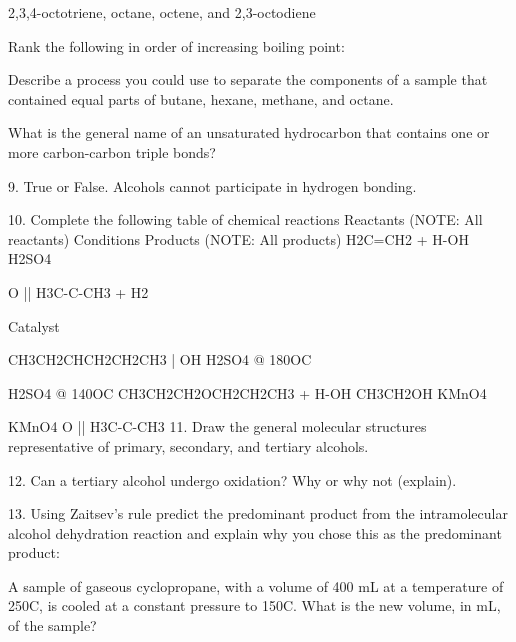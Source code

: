 \documentclass[addpoints, 12pt]{exam}
\begin{document}
\begin{questions}
2,3,4-octotriene, octane, octene, and 2,3-octodiene


\question Rank the following in order of increasing boiling point:

\question Describe a process you could use to separate the components
of a sample that contained equal parts of butane, hexane, methane, and
octane.

\question 




\question What is the general name of an unsaturated hydrocarbon that
contains one or more carbon-carbon triple bonds?



9. True or False.  Alcohols cannot participate in hydrogen bonding.


10. Complete the following table of chemical reactions
Reactants (NOTE: All reactants)
Conditions
Products (NOTE: All products) 
H2C=CH2 + H-OH 
H2SO4

        O
          ||
H3C-C-CH3 + H2

Catalyst

CH3CH2CHCH2CH2CH3
             |
             OH
H2SO4 @ 180OC


H2SO4 @ 140OC
CH3CH2CH2OCH2CH2CH3 + H-OH
CH3CH2OH
KMnO4


KMnO4
        O
          ||
H3C-C-CH3
11.  Draw the general molecular structures representative of primary, secondary, and tertiary alcohols.


12. Can a tertiary alcohol undergo oxidation? Why or why not (explain).

13. Using Zaitsev’s rule predict the predominant product from the intramolecular alcohol dehydration reaction and explain why you chose this as the predominant product: 






\question A sample of gaseous cyclopropane, with a volume of 400 mL at a
temperature of 250C, is cooled at a constant pressure to 150C.  What
is the new volume, in mL, of the sample?




\end{questions}
\end{document}
